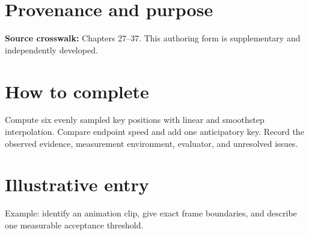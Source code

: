 \documentclass[10pt,letterpaper]{article}
\begin{document}
\makedoctitle
\makedocsummary

\section{Provenance and purpose}
\textbf{Source crosswalk:} Chapters 27--37. This authoring form is supplementary and independently developed.
\section{How to complete}
Compute six evenly sampled key positions with linear and smoothstep interpolation. Compare endpoint speed and add one anticipatory key. Record the observed evidence, measurement environment, evaluator, and unresolved issues. 
\section{Illustrative entry}
Example: identify an animation clip, give exact frame boundaries, and describe one measurable acceptance threshold.
\end{document}

